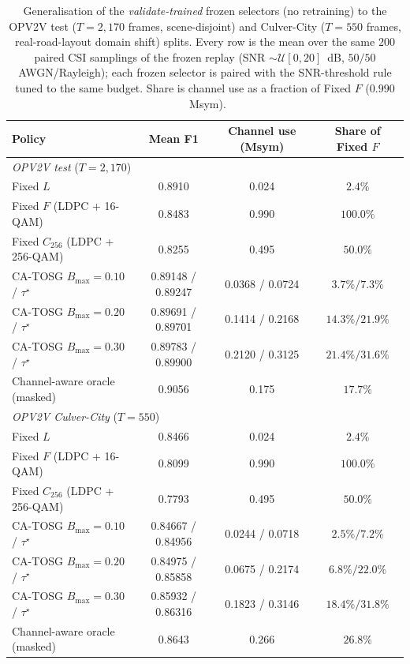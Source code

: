 \documentclass[journal]{IEEEtran}
\newcommand{\method}{CA-TOSG}
\begin{document}
\begin{table}[t]
\centering
\caption{Generalisation of the \emph{validate-trained} frozen selectors (no retraining) to the OPV2V test ($T=2{,}170$ frames, scene-disjoint) and Culver-City ($T=550$ frames, real-road-layout domain shift) splits. Every row is the mean over the same $200$ paired CSI samplings of the frozen replay (SNR $\sim\mathcal{U}[0,20]$~dB, $50/50$ AWGN/Rayleigh); each frozen selector is paired with the SNR-threshold rule tuned to the same budget. Share is channel use as a fraction of Fixed $F$ ($0.990$~Msym).}
\label{tab:gen_headline}
\begin{tabular}{lccc}
\toprule
Policy & Mean F1 & Channel use (Msym) & Share of Fixed $F$ \\
\midrule
\multicolumn{4}{l}{\emph{OPV2V test} ($T=2{,}170$)} \\
Fixed $L$                       & 0.8910 & 0.024 & $2.4\%$ \\
Fixed $F$ (LDPC + 16-QAM)       & 0.8483 & 0.990 & $100.0\%$ \\
Fixed $C_{256}$ (LDPC + 256-QAM)& 0.8255 & 0.495 & $50.0\%$ \\
\quad \method{} $B_{\max}{=}0.10$ / $\tau^\star$ & 0.89148 / 0.89247 & 0.0368 / 0.0724 & $3.7\% / 7.3\%$ \\
\quad \method{} $B_{\max}{=}0.20$ / $\tau^\star$ & 0.89691 / 0.89701 & 0.1414 / 0.2168 & $14.3\% / 21.9\%$ \\
\quad \method{} $B_{\max}{=}0.30$ / $\tau^\star$ & 0.89783 / 0.89900 & 0.2120 / 0.3125 & $21.4\% / 31.6\%$ \\
Channel-aware oracle (masked)   & 0.9056 & 0.175 & $17.7\%$ \\
\midrule
\multicolumn{4}{l}{\emph{OPV2V Culver-City} ($T=550$)} \\
Fixed $L$                       & 0.8466 & 0.024 & $2.4\%$ \\
Fixed $F$ (LDPC + 16-QAM)       & 0.8099 & 0.990 & $100.0\%$ \\
Fixed $C_{256}$ (LDPC + 256-QAM)& 0.7793 & 0.495 & $50.0\%$ \\
\quad \method{} $B_{\max}{=}0.10$ / $\tau^\star$ & 0.84667 / 0.84956 & 0.0244 / 0.0718 & $2.5\% / 7.2\%$ \\
\quad \method{} $B_{\max}{=}0.20$ / $\tau^\star$ & 0.84975 / 0.85858 & 0.0675 / 0.2174 & $6.8\% / 22.0\%$ \\
\quad \method{} $B_{\max}{=}0.30$ / $\tau^\star$ & 0.85932 / 0.86316 & 0.1823 / 0.3146 & $18.4\% / 31.8\%$ \\
Channel-aware oracle (masked)   & 0.8643 & 0.266 & $26.8\%$ \\
\bottomrule
\end{tabular}
\end{table}
\end{document}
